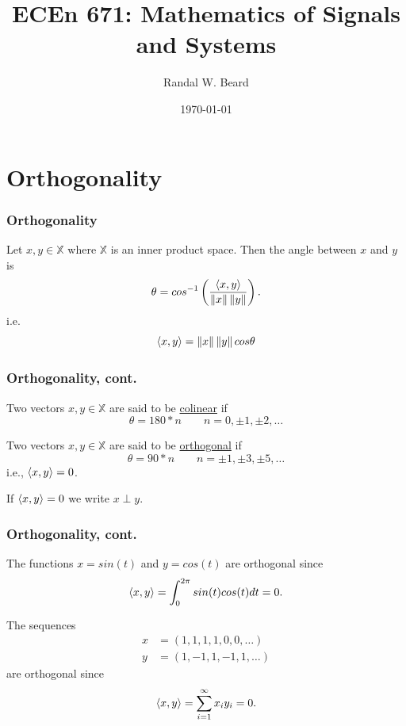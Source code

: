 \documentclass{beamer}
\title{ECEn 671: Mathematics of Signals and Systems}
\author{Randal W. Beard}
\institute{Brigham Young University}
\date{\today}
\begin{document}
\begin{frame}
	\titlepage
\end{frame}


\section{Orthogonality}
\frame{\sectionpage}

\begin{frame}\frametitle{Orthogonality}
Let $x,y \in \mathbb{X}$ where $\mathbb{X}$ is an inner product space.  Then the angle between $x$ and $y$ is 
\[ 
\theta = cos^{-1}\left( \frac{\left< x,y \right>}{\left\| x\right\|  \left\| y\right\| } \right). 
\]
i.e.
\[ 
\left< x,y \right> = \left\| x\right\|  \left\| y\right\|  cos \theta 
\]
\end{frame}

\begin{frame}\frametitle{Orthogonality, cont.}

\begin{definition}[Colinear]
Two vectors $x,y \in \mathbb{X}$ are said to be \underline{colinear} if 
\[ 
\theta = 180*n \qquad n = 0, \pm 1, \pm 2, \ldots 
\]
\end{definition}

\begin{definition}[Orthogonal] 
Two vectors $x,y \in \mathbb{X}$ are said to be \underline{orthogonal} if 
\[ 
\theta = 90*n \qquad n = \pm 1, \pm 3, \pm 5, \ldots 
\]
i.e., $\left< x,y \right> = 0$.
\end{definition}

\vspace{1cm}

If $\left< x,y \right> = 0$ we write $x \perp y$.\\

\end{frame}

\begin{frame}\frametitle{Orthogonality, cont.}

\begin{example}[Vectors in $L_2[0,2\pi)$]
The functions $x=sin(t)$ and $y = cos(t)$ are orthogonal since 
\[ 
\left< x,y \right> = \int_{0}^{2\pi}sin(t)cos(t)dt = 0.
\]
\end{example}

\begin{example}
The sequences 
\begin{align*}
x &= (1, 1, 1, 1, 0, 0, \dots ) \\	
y &= (1, -1, 1, -1, 1, \dots)
\end{align*}
are orthogonal since 
\[ 
\left< x,y \right> = \sum_{i=1}^\infty x_i y_i = 0.
\]
\end{example}
\end{frame}
\end{document}
